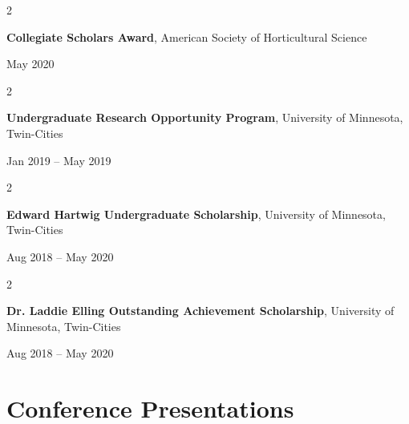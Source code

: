 \documentclass[10pt, letterpaper]{article}
\newenvironment{twocolentry}[2][]{
    \onecolentry
    \def\secondColumn{#2}
    \setcolumnwidth{\fill, 4.5 cm}
    \begin{paracol}{2}
}{
    \switchcolumn \raggedleft \secondColumn
    \end{paracol}
    \endonecolentry
} %
\begin{document}
        \vspace{0.2 cm}


        \begin{samepage} 
            \begin{twocolentry}{
                May 2020
                }
                \textbf{Collegiate Scholars Award}, American Society of Horticultural Science
            \end{twocolentry}
        \end{samepage}  


        \vspace{0.2 cm}
        
        
        \begin{samepage} 
            \begin{twocolentry}{
                Jan 2019 – May 2019
                }
                \textbf{Undergraduate Research Opportunity Program}, University of Minnesota, Twin-Cities
            \end{twocolentry}
        \end{samepage}  


        \vspace{0.2 cm}


        \begin{samepage} 
            \begin{twocolentry}{
                Aug 2018 – May 2020
                }
                \textbf{Edward Hartwig Undergraduate Scholarship}, University of Minnesota, Twin-Cities
            \end{twocolentry}
        \end{samepage}  


        \vspace{0.2 cm}


        \begin{samepage} 
            \begin{twocolentry}{
                Aug 2018 – May 2020
                }
                \textbf{Dr. Laddie Elling Outstanding Achievement Scholarship}, University of Minnesota, Twin-Cities
            \end{twocolentry}
        \end{samepage}  
        

        

    \section{Conference Presentations}
\end{document}
